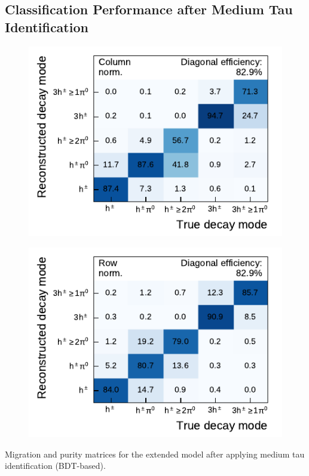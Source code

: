 \subsection{Classification Performance after Medium Tau Identification}

\noindent
\begin{minipage}{\textwidth}
  \captionsetup{type=figure}
  \begin{subfigure}{0.48\textwidth}
    \centering
    \includegraphics{./figures/decay_mode_classification/combined_sub_e_moments_shots_conv_ptcut_1_5/mig_mat_med_id.pdf}
  \end{subfigure}\hfill
  \begin{subfigure}{0.48\textwidth}
    \centering
    \includegraphics{./figures/decay_mode_classification/combined_sub_e_moments_shots_conv_ptcut_1_5/comp_mat_med_id.pdf}
  \end{subfigure}
  \caption{Migration and purity matrices for the extended model after applying
    medium tau identification (BDT-based).}
  \label{fig:decay_mode_combined_med_id}
\end{minipage}

